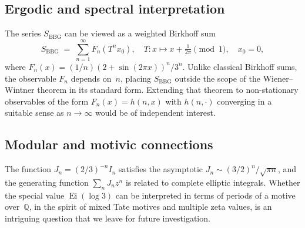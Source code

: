 \documentclass[12pt]{amsart}
\DeclareMathOperator{\Ei}{Ei}
\begin{document}
\subsection{Ergodic and spectral interpretation}

The series $S_{\mathrm{BBG}}$ can be viewed as a weighted Birkhoff sum
\[
  S_{\mathrm{BBG}} \;=\;
  \sum_{n=1}^{\infty} F_n\!\left(T^n x_0\right),
  \quad T\colon x\mapsto x+\tfrac{1}{2\pi}\!\!\pmod{1},
  \quad x_0=0,
\]
where $F_n(x)=(1/n)(2+\sin(2\pi x))^n/3^n$.  Unlike classical
Birkhoff sums, the observable $F_n$ depends on~$n$, placing
$S_{\mathrm{BBG}}$ outside the scope of the Wiener--Wintner theorem
in its standard form.  Extending that theorem to non-stationary
observables of the form $F_n(x)=h(n,x)$ with $h(n,\cdot)$
converging in a suitable sense as $n\to\infty$ would be of
independent interest.

\subsection{Modular and motivic connections}

The function $J_n=(2/3)^{-n}I_n$ satisfies the asymptotic
$J_n\sim(3/2)^n/\sqrt{\pi n}$, and the generating function
$\sum_n J_n z^n$ is related to complete elliptic integrals.
Whether the special value $\Ei(\log 3)$ can be interpreted
in terms of periods of a motive over~$\mathbb{Q}$, in the
spirit of mixed Tate motives and multiple zeta values, is
an intriguing question that we leave for future investigation.
\end{document}

